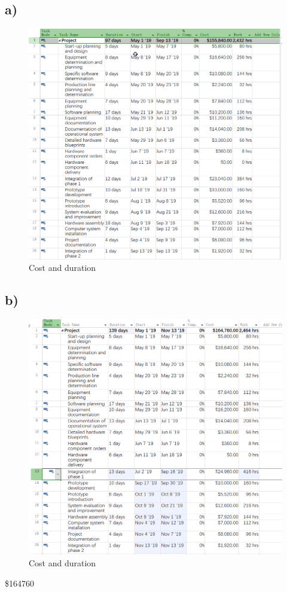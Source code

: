 \documentclass[runningheads]{llncs}
\begin{document}
\subsection*{a)}

\begin{figure}[H]
    \centering
    \includegraphics[width=1.0\textwidth]{./image/l1}
    \caption{Cost and duration}
\end{figure}

\subsection*{b)}
\begin{figure}[H]
    \centering
    \includegraphics[width=1.0\textwidth]{./image/l4}
    \caption{Cost and duration}
\end{figure}
\$164760
\end{document}
